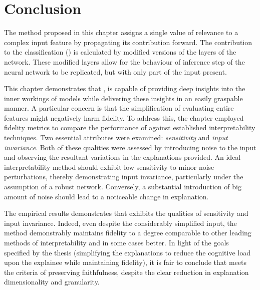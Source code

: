 

\section{Conclusion}

The method proposed in this chapter assigns a single value of relevance to a complex input feature by propagating its contribution forward. The contribution to the classification (\CTC\/) is calculated by modified versions of the layers of the network. These modified layers allow for the behaviour of inference step of the neural network to be replicated, but with only part of the input present. 

This chapter demonstrates that \CTC\/, is capable of providing deep insights into the inner workings of models while delivering these insights in an easily graspable manner. A particular concern is that the simplification of evaluating entire features might negatively harm fidelity. To address this, the chapter employed fidelity metrics to compare the performance of \CTC\/ against established interpretability techniques. Two essential attributes were examined: \emph{sensitivity} and \emph{input invariance}. Both of these qualities were assessed by introducing noise to the input and observing the resultant variations in the explanations provided. An ideal interpretability method should exhibit low sensitivity to minor noise perturbations, thereby demonstrating input invariance, particularly under the assumption of a robust network. Conversely, a substantial introduction of big amount of noise should lead to a noticeable change in explanation. 

The empirical results demonstrates that \CTC\/ exhibits the qualities of sensitivity and input invariance. Indeed, even despite the considerably simplified input, the method demonstrably maintains fidelity to a degree comparable to other leading methods of interpretability and in some cases better. In light of the goals specified by the thesis (simplifying the explanations to reduce the cognitive load upon the explainee while maintaining fidelity), it is fair to conclude that \CTC\/ meets the criteria of preserving faithfulness, despite the clear reduction in explanation dimensionality and granularity. 


